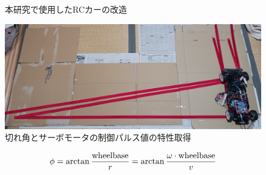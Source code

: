 \begin{figure}[h]
  \begin{center}
  \caption{本研究で使用したRCカーの改造}
  \label{auto:rc}
  \end{center}
\end{figure}

\begin{figure}[h]
  \begin{center}
    \includegraphics[width=.9\linewidth]{img/auto_35.jpg}
    \caption{切れ角とサーボモータの制御パルス値の特性取得}
    \label{auto:tokusei}
  \end{center}  
\end{figure}

\begin{align}
  \phi = \arctan\frac{\rm{wheelbase}}{r} = \arctan\frac{\omega \cdot \rm{wheelbase}}{v} \label{auto:eq:ackermann}
\end{align}

